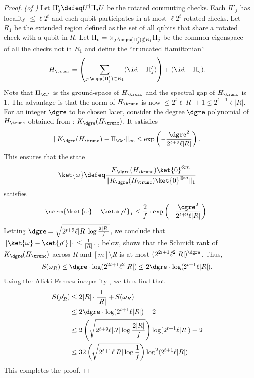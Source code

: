 \documentclass{toc}
\begin{document}
\begin{proof}\textit{(of )}
Let $\Pi'_j\defeq U^{\dagger}\Pi_j U$ be the rotated commuting checks.  Each $\Pi'_j$ has locality $\leq\ell 2^t$ and each qubit participates in at most $\ell 2^t$ rotated checks. Let $R_1$ be the extended region defined as the set of all qubits that share a rotated check with a qubit in $R$. Let $\Pi_c = \times_{j: \supp(\Pi'_j)\notin R_1}\Pi_j$ be the common eigenspace of all the checks not in $R_1$ and define the ``truncated Hamiltonian'' 
\begin{align}
H_{\trunc}= \left(\sum_{j:\supp(\Pi'_j)\subset R_1}(\id- \Pi'_j)\right) + (\id-\Pi_c).
\end{align}
Note that $\Pi_{\Cc'}$ is the ground-space of $H_{\trunc}$ and the spectral gap of $H_{\trunc}$ is $1$. The advantage is that the norm of $H_{\trunc}$ is now $\leq 2^t\ell|R|+1 \leq 2^{t+1}\ell|R|$.
For an integer $\dgre$ to be chosen later, consider the degree $\dgre$ polynomial of $H_\trunc$ obtained from : $K_{\dgre}(H_{\trunc})$. It satisfies 
\begin{align}\|K_{\dgre}(H_{\trunc})-\Pi_{\Cc'}\|_{\infty} \leq \exp\left(-\frac{\dgre^2}{2^{t+9}\ell|R|}\right).
\end{align} 
This ensures that the state 
\begin{align}\ket{\omega} \defeq \frac{K_{\dgre}(H_{\trunc})\ket{0}^{\otimes m}}{\|K_{\dgre}(H_{\trunc})\ket{0}^{\otimes m}\|_1}
\end{align} satisfies \begin{align}\norm{\ket{\omega}-\ket*{\rho'}}_1 \leq \frac{2}{f} \cdot \exp \left(-\frac{\dgre^2}{2^{t+9}\ell|R|}\right).
\end{align}
Letting $\dgre= \sqrt{2^{t+9}\ell|R|\log\frac{2|R|}{f}}$, we conclude that 
$\|\ket{\omega}-\ket{\rho'}\|_1\leq \frac{1}{|R|}$. , below, shows that the Schmidt rank of $K_{\dgre}(H_{\trunc})$ across $R$ and $[m]\setminus R$ is at most $(2^{2t+1}\ell^2|R|)^{\dgre}$. Thus,
\begin{align}S(\omega_R)\leq \dgre\cdot \log (2^{2t+1}\ell^2|R|)\leq 2\dgre\cdot\log (2^{t+1}\ell|R|).\end{align} Using the Alicki-Fannes inequality \cite{AlickiF04}, we thus find that 
\begin{align}
S(\rho'_R) &\leq 2|R|\cdot \frac{1}{|R|} + S(\omega_R) \\ &\leq 2\dgre\cdot \log (2^{t+1}\ell|R|)+2 \\
&\leq 2\left(\sqrt{2^{t+9}\ell|R|\log\frac{2|R|}{f}}\right)\log(2^{t+1}\ell|R|) +2\\
&\leq 32\left(\sqrt{2^{t+1}\ell|R|\log\frac{1}{f}}\right)\log^2 (2^{t+1}\ell|R|).
\end{align}
This completes the proof.
\end{proof}
\end{document}
